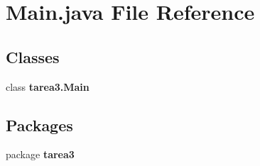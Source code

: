 \section{Main.\+java File Reference}
\label{_main_8java}
\subsection*{Classes}
\begin{DoxyCompactItemize}
\item 
class {\bf tarea3.\+Main}
\end{DoxyCompactItemize}
\subsection*{Packages}
\begin{DoxyCompactItemize}
\item 
package {\bf tarea3}
\end{DoxyCompactItemize}
